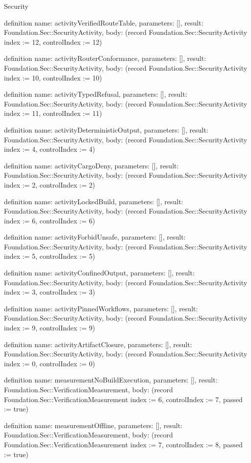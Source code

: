 \begin{lexlean}{Security}
\begin{semanticmodule}
definition{
  name: activityVerifiedRouteTable,
  parameters: [],
  result: Foundation.Sec::SecurityActivity,
  body: (record Foundation.Sec::SecurityActivity {index := 12, controlIndex := 12})
}

definition{
  name: activityRouterConformance,
  parameters: [],
  result: Foundation.Sec::SecurityActivity,
  body: (record Foundation.Sec::SecurityActivity {index := 10, controlIndex := 10})
}

definition{
  name: activityTypedRefusal,
  parameters: [],
  result: Foundation.Sec::SecurityActivity,
  body: (record Foundation.Sec::SecurityActivity {index := 11, controlIndex := 11})
}

definition{
  name: activityDeterministicOutput,
  parameters: [],
  result: Foundation.Sec::SecurityActivity,
  body: (record Foundation.Sec::SecurityActivity {index := 4, controlIndex := 4})
}

definition{
  name: activityCargoDeny,
  parameters: [],
  result: Foundation.Sec::SecurityActivity,
  body: (record Foundation.Sec::SecurityActivity {index := 2, controlIndex := 2})
}

definition{
  name: activityLockedBuild,
  parameters: [],
  result: Foundation.Sec::SecurityActivity,
  body: (record Foundation.Sec::SecurityActivity {index := 6, controlIndex := 6})
}

definition{
  name: activityForbidUnsafe,
  parameters: [],
  result: Foundation.Sec::SecurityActivity,
  body: (record Foundation.Sec::SecurityActivity {index := 5, controlIndex := 5})
}

definition{
  name: activityConfinedOutput,
  parameters: [],
  result: Foundation.Sec::SecurityActivity,
  body: (record Foundation.Sec::SecurityActivity {index := 3, controlIndex := 3})
}

definition{
  name: activityPinnedWorkflows,
  parameters: [],
  result: Foundation.Sec::SecurityActivity,
  body: (record Foundation.Sec::SecurityActivity {index := 9, controlIndex := 9})
}

definition{
  name: activityArtifactClosure,
  parameters: [],
  result: Foundation.Sec::SecurityActivity,
  body: (record Foundation.Sec::SecurityActivity {index := 0, controlIndex := 0})
}

definition{
  name: measurementNoBuildExecution,
  parameters: [],
  result: Foundation.Sec::VerificationMeasurement,
  body: (record Foundation.Sec::VerificationMeasurement {index := 6, controlIndex := 7, passed := true})
}

definition{
  name: measurementOffline,
  parameters: [],
  result: Foundation.Sec::VerificationMeasurement,
  body: (record Foundation.Sec::VerificationMeasurement {index := 7, controlIndex := 8, passed := true})
}


\end{semanticmodule}
\end{lexlean}
